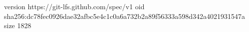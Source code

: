 version https://git-lfs.github.com/spec/v1
oid sha256:dc78fec0926dae32afbc5e4c1c0a6a732b2a89f56333a598d342a4021931547a
size 1828
